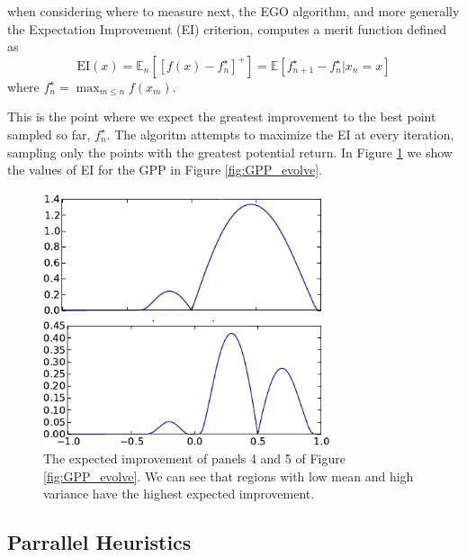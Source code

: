 \documentclass[phd,tocprelim]{cornell}
\begin{document}
when considering where to measure next, the EGO algorithm, and more generally the Expectation Improvement (EI) criterion, computes a merit function defined as
\begin{equation}
 \mbox{EI}(x) = \mathbb{E}_{n} \left[\left[ f(x) - f_{n}^{\star} \right]^{+} \right] = \mathbb{E} \left[ f_{n+1}^{\star} - f_{n}^{\star} | x_{n} = x\right]
\end{equation}
where $f_{n}^{\star} = \max_{m \leq n} f(x_{m})$.

This is the point where we expect the greatest improvement to the best point sampled so far, $f_{n}^{\star}$. The algoritm attempts to maximize the EI at every iteration, sampling only the points with the greatest potential return. In Figure \ref{fig:GPP_EI_evolve} we show the values of EI for the GPP in Figure \ref{fig:GPP_evolve}.

\begin{figure}[hpt]
 	\centerline{\includegraphics[width=0.75\textwidth]{figures/EPI/GPP_example_EI4.png}}
    \centerline{\includegraphics[width=0.75\textwidth]{figures/EPI/GPP_example_EI.png}}
    \caption[Evolution of expected improvement of a GPP]{The expected improvement of panels 4 and 5 of Figure \ref{fig:GPP_evolve}. We can see that regions with low mean and high variance have the highest expected improvement.}
 	\label{fig:GPP_EI_evolve}
\end{figure}

\subsection{Parrallel Heuristics}
\end{document}
